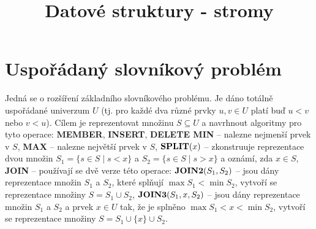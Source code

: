 \documentclass[a4paper,12pt]{article}
\def \emph#1{\underbar{#1}}
\DeclareMathOperator*{\Prob}{Prob}
\begin{document}
     

\newtheorem*{dusledek}{Důsledek}
\newtheorem*{lemma}{Lemma}

\newtheorem{counter}{Counter}
\newtheorem{lemma_counting}[counter]{Lemma}
\newtheorem{dusledek_counting}[counter]{Důsledek}

\newtheorem*{pozorovani}{Pozorování}

\newtheorem*{veta}{Věta}
\newtheorem*{tvrzeni}{Tvrzení}
\newtheorem*{definice}{Definice}

\def \emph#1{\underbar{#1}}
\def \Prob{\operatorname{Prob}}
\def \var{\operatorname{var}}

\title{Datové struktury - stromy}
\date{}
\maketitle

\tableofcontents

\section{Uspořádaný slovníkový problém}

Jedná se o rozšíření základního slovníkového problému. Je 
dáno totálně uspořádané univerzum $U$ (tj. pro každé dva 
různé prvky $u,v\in U$ platí buď $u<v$ nebo $v<
u$). Cílem 
je reprezentovat 
množinu $S\subseteq U$ a navrhnout algoritmy pro tyto operace:\newline 
{\bf MEMBER}, {\bf INSERT}, {\bf DELETE\newline 
MIN} -- nalezne nejmenší prvek v $S$,\newline 
{\bf MAX} -- nalezne největší prvek v $S$,\newline 
$\bold S\bold P\bold L\bold I\bold T(x)$ -- zkonstruuje reprezentace dvou množin 
$S_1=\{s\in S\mid s<x\}$ a $S_2=\{s\in S\mid s>x\}$ a oznámí, zda 
$x\in S$,\newline 
{\bf JOIN} -- používají se dvě verze této operace:\newline 
$\bold J\bold O\bold I\bold N\bold 2(S_1,S_2)$ -- jsou dány reprezentace množin $
S_1$ a $S_2$, které 
splňují $\max S_1<\min S_2$, vytvoří se reprezentace množiny 
$S=S_1\cup S_2$,\newline 
$\bold J\bold O\bold I\bold N\bold 3(S_1,x,S_2)$ -- jsou dány reprezentace množin $
S_1$ a $S_2$ a 
prvek $x\in U$ tak, že je splněno $\max S_1<x<\min S_2$, vytvoří 
se reprezentace množiny $S=S_1\cup \{x\}\cup S_2$.
\end{document}
